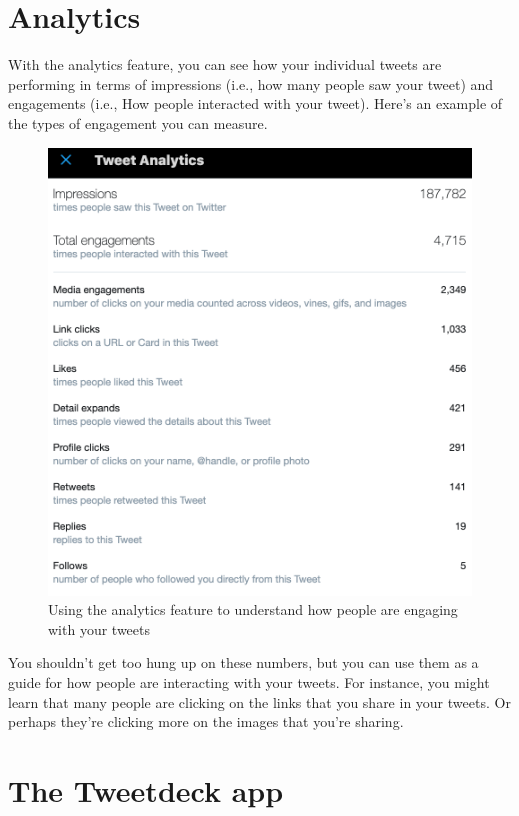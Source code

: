 \documentclass[]{book}
\begin{document}
\hypertarget{analytics}{%
\section{Analytics}\label{analytics}}

With the analytics feature, you can see how your individual tweets are performing in terms of impressions (i.e., how many people saw your tweet) and engagements (i.e., How people interacted with your tweet). Here's an example of the types of engagement you can measure.

\begin{figure}

\includegraphics[width=0.8\linewidth]{images/analytics} \hfill{}

\caption{Using the analytics feature to understand how people are engaging with your tweets}\label{fig:unnamed-chunk-5}
\end{figure}

You shouldn't get too hung up on these numbers, but you can use them as a guide for how people are interacting with your tweets. For instance, you might learn that many people are clicking on the links that you share in your tweets. Or perhaps they're clicking more on the images that you're sharing.

\hypertarget{the-tweetdeck-app}{%
\section{The Tweetdeck app}\label{the-tweetdeck-app}}
\end{document}
